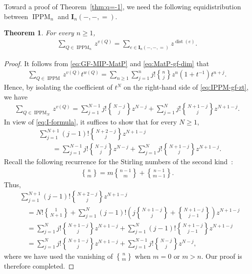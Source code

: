 \documentclass[12pt,reqno]{amsart}
\numberwithin{equation}{section}
\theoremstyle{theorem}
\newtheorem{theorem}{Theorem}[section]
\theoremstyle{definition}
\theoremstyle{named}
\newcommand{\dist}{\operatorname{dist}}
\newcommand{\stirlingb}[2]{{#1\brace #2}}
\newcommand{\sw}{v}
\newcommand{\bI}{\mathbf{I}}
\newcommand{\IPPM}{\operatorname{IPPM}}
\begin{document}
Toward a proof of Theorem~\ref{thm:q=-1}, we need the following equidistribution between $\IPPM_{n}$ and $\bI_n(-,-,=)$.

\begin{theorem}\label{th:MIP-I}
	For every $n\ge 1$,
	\begin{align}\label{eq:MIP-I}
		\sum_{Q\in \IPPM_{n}} z^{\sw(Q)} = \sum_{e\in \bI_n(-,-,=)} z^{\dist(e)}.
	\end{align}
\end{theorem}

\begin{proof}
	It follows from \eqref{eq:GF-MIP-MatP} and \eqref{eq:MatP-gf-dim} that
	\begin{align}\label{eq:IPPM-gf-zt}
		\sum_{Q\in \IPPM} z^{\sw(Q)} t^{w(Q)} = \sum_{n\ge 1} \sum_{j=1}^n j! \stirlingb{n}{j} z^{n} (1+t^{-1}) t^{n+j}.
	\end{align}
	Hence, by isolating the coefficient of $t^N$ on the right-hand side of \eqref{eq:IPPM-gf-zt}, we have
	\begin{align*}
		\sum_{Q\in \IPPM_{N}} z^{\sw(Q)} = \sum_{j=1}^{N-1} j! \stirlingb{N-j}{j} z^{N-j} + \sum_{j=1}^{N} j! \stirlingb{N+1-j}{j} z^{N+1-j}.
	\end{align*}
	In view of \eqref{eq:I-formula}, it suffices to show that for every $N\ge 1$,
	\begin{align*}
		&\sum_{j=1}^{N+1} (j-1)! \stirlingb{N+2-j}{j} z^{N+1-j}\\
		&\qquad=\sum_{j=1}^{N-1} j! \stirlingb{N-j}{j} z^{N-j} + \sum_{j=1}^{N} j! \stirlingb{N+1-j}{j} z^{N+1-j}.
	\end{align*}
	Recall the following recurrence for the Stirling numbers of the second kind~\cite[p.~625, eq.~(26.8.22)]{Bre2010}:
	\begin{align*}
		\stirlingb{n}{m} = m \stirlingb{n-1}{m} + \stirlingb{n-1}{m-1}.
	\end{align*}
	Thus,
	\begin{align*}
		&\sum_{j=1}^{N+1} (j-1)! \stirlingb{N+2-j}{j} z^{N+1-j}\\
		&\quad = N! \stirlingb{1}{N+1} + \sum_{j=1}^{N} (j-1)! \left(j\stirlingb{N+1-j}{j} + \stirlingb{N+1-j}{j-1}\right)z^{N+1-j}\\
		&\quad = \sum_{j=1}^{N} j! \stirlingb{N+1-j}{j} z^{N+1-j} + \sum_{j=1}^{N} (j-1)! \stirlingb{N+1-j}{j-1} z^{N+1-j}\\
		&\quad = \sum_{j=1}^{N} j! \stirlingb{N+1-j}{j} z^{N+1-j} + \sum_{j=1}^{N-1} j! \stirlingb{N-j}{j} z^{N-j},
	\end{align*}
	where we have used the vanishing of $\stirlingb{n}{m}$ when $m=0$ or $m>n$. Our proof is therefore completed.
\end{proof}
\end{document}
